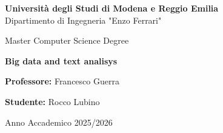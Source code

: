 \documentclass[12pt,a4paper,oneside,onecolumn,openright]{book}
\begin{document}
\begin{titlepage}
  \begin{center}
  
      {\Large \textbf{Università degli Studi di Modena e Reggio Emilia}} \\[2mm]
      {\large Dipartimento di Ingegneria "Enzo Ferrari"} \\[15mm]
  
  
      
      {\large Master Computer Science Degree} \\
      
        \vspace{0.5cm}
      
      {\huge \textbf{Big data and text analisys}} \\

  
  
      \begin{flushleft}
          \textbf{Professore:} Francesco Guerra \\[5mm]
      \end{flushleft}
  
      \vspace{1.2cm}
  
      \begin{flushright}
          \textbf{Studente:} Rocco Lubino \\
      \end{flushright}
  
      \vspace{2cm}
      {\large Anno Accademico 2025/2026}
  
  \end{center}
\end{titlepage}

  

\setcounter{tocdepth}{1}
\tableofcontents
\newpage  %


    
    
\end{document}
